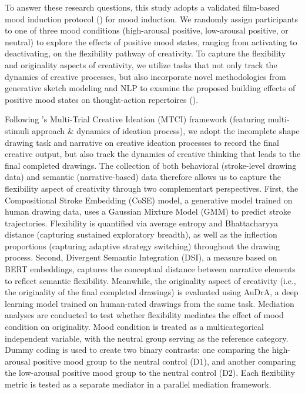 \documentclass[../MA_Thesis.tex]{subfiles}
\begin{document}
To answer these research questions, this study adopts a validated film-based mood induction protocol (\cite{siedlecka_experimental_2019}) for mood induction. We randomly assign participants to one of three mood conditions (high-arousal positive, low-arousal positive, or neutral) to explore the effects of positive mood states, ranging from activating to deactivating, on the flexibility pathway of creativity. To capture the flexibility and originality aspects of creativity, we utilize tasks that not only track the dynamics of creative processes, but also incorporate novel methodologies from generative sketch modeling and NLP to examine the proposed building effects of positive mood states on thought-action repertoires (\cite{fredrickson_role_2001}). 

Following \textcite{barbot_dynamics_2018}'s Multi-Trial Creative Ideation (MTCI) framework (featuring multi-stimuli approach \& dynamics of ideation process), we adopt the incomplete shape drawing task and narrative on creative ideation processes to record the final creative output, but also track the dynamics of creative thinking that leads to the final completed drawings. The collection of both behavioral (stroke-level drawing data) and semantic (narrative-based) data therefore allows us to capture the flexibility aspect of creativity through two complementart perspectives. First, the Compositional Stroke Embedding (CoSE) model, a generative model trained on human drawing data, uses a Gaussian Mixture Model (GMM) to predict stroke trajectories. Flexibility is quantified via average entropy and Bhattacharyya distance (capturing sustained exploratory breadth), as well as the inflection proportions (capturing adaptive strategy switching) throughout the drawing process. Second, Divergent Semantic Integration (DSI), a measure based on BERT embeddings, captures the conceptual distance between narrative elements to reflect semantic flexibility. Meanwhile, the originality aspect of creativity (i.e., the originality of the final completed drawings) is evaluated using AuDrA, a deep learning model trained on human-rated drawings from the same task. Mediation analyses are conducted to test whether flexibility mediates the effect of mood condition on originality. Mood condition is treated as a multicategorical independent variable, with the neutral group serving as the reference category. Dummy coding is used to create two binary contrasts: one comparing the high-arousal positive mood group to the neutral control (D1), and another comparing the low-arousal positive mood group to the neutral control (D2). Each flexibility metric is tested as a separate mediator in a parallel mediation framework.
\end{document}
